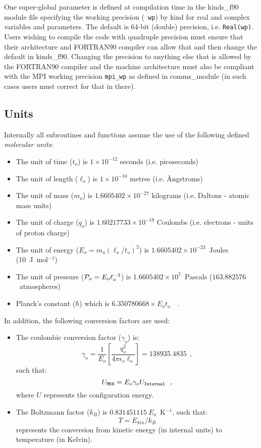 One super-global parameter is defined at compilation time in the
{\sc kinds\_f90} module file specifying the working precision ({\tt
wp}) by kind for real and complex variables and parameters.  The
default is 64-bit (double) precision, i.e. {\tt Real(wp)}.  Users
wishing to compile the code with quadruple precision must ensure
that their architecture and FORTRAN90 compiler can allow that and
then change the default in {\sc kinds\_f90}.  Changing the precision
to anything else that is allowed by the FORTRAN90 compiler and the
machine architecture must also be compliant with the MPI working
precision {\tt mpi\_wp} as defined in {\sc comms\_module} (in such
cases users must correct for that in there).

\subsection{Units}\label{units}

Internally all \D subroutines and functions assume the use of the
following defined {\em molecular units}:
\begin{itemize}
\item The unit of time ($t_{o}$) is $1 \times 10^{-12}$ seconds (i.e. picoseconds)
\item The unit of length ($\ell_{o}$) is $1 \times 10^{-10}$ metres (i.e. \AA ngstroms)
\item The unit of mass ($m_{o}$) is $1.6605402 \times 10^{-27}$ kilograms (i.e. Daltons - atomic mass units)
\item The unit of charge ($q_{o}$) is $1.60217733 \times 10^{-19}$ Coulombs (i.e. electrons - units of proton charge)
\item The unit of energy ($E_{o}=m_{o}(\ell_{o}/t_{o})^{2}$) is $1.6605402 \times 10^{-23}$~Joules (10~J~mol$^{-1}$)
\item The unit of pressure (${\cal P}_{o}=E_{o}\ell_{o}^{-3}$) is $1.6605402 \times 10^{7}$~Pascals ($163.882576$~atmospheres)
\item Planck's constant ($\hbar$) which is $6.350780668 \times E_{o} t_{o}$~~.
\end{itemize}

\noindent In addition, the following conversion factors are used:

\begin{itemize}
\item The coulombic conversion
factor ($\gamma_{o}$) is:
\[ \gamma_{o} = \frac{1}{E_{o}} \left[ \frac{q_{o}^{2}}{4 \pi \epsilon_{o} \ell_{o}} \right] = 138935.4835~~, \]
such that:
\[U_{\tt MKS}=E_{o}\gamma_{o}U_{\tt Internal}~~,\]
where $U$ represents the configuration energy.
\item The Boltzmann factor ($k_{B}$) is $0.831451115~E_{o}$~K$^{-1}$,
such that:
\[T=E_{kin}/k_{B}\]
represents the conversion from kinetic energy (in internal units)
to temperature (in Kelvin).
\end{itemize}

